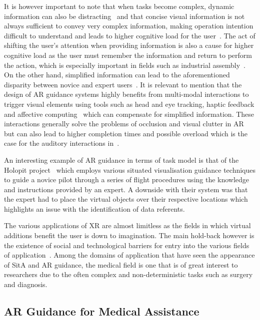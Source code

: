 It is however important to note that when tasks become complex, dynamic information can also be distracting~\cite{wang2022comprehensive} and that concise visual information is not always sufficient to convey very complex information, making operation intention difficult to understand and leads to higher cognitive load for the user~\cite{mizell2001fundamentals,fiorentino2009tangible}.
The act of shifting the user's attention when providing information is also a cause for higher cognitive load as the user must remember the information and return to perform the action, which is especially important in fields such as industrial assembly~\cite{vanneste2020cognitive}.
On the other hand, simplified information can lead to the aforementioned disparity between novice and expert users~\cite{wang2022comprehensive}.
It is relevant to mention that the design of AR guidance systems highly benefits from multi-modal interactions to trigger visual elements using tools such as head and eye tracking, haptic feedback and affective computing~\cite{wang2022comprehensive} which can compensate for simplified information. These interactions generally solve the problems of occlusion and visual clutter in AR~\cite{truong2021user} but can also lead to higher completion times and possible overload which is the case for the auditory interactions in~\cite{marquardt2020comparing}. 

An interesting example of AR guidance in terms of task model is that of the Holopit project~\cite{lallai2021engineering} which employs various situated visualisation guidance techniques to guide a novice pilot through a series of flight procedures using the knowledge and instructions provided by an expert.
A downside with their system was that the expert had to place the virtual objects over their respective locations which highlights an issue with the identification of data referents.

The various applications of XR are almost limitless as the fields in which virtual additions benefit the user is down to imagination. 
The main hold-back however is the existence of social and technological barriers for entry into the various fields of application~\cite{fast2018testing}.
Among the domains of application that have seen the appearance of SitA and AR guidance, the medical field is one that is of great interest to researchers due to the often complex and non-deterministic tasks such as surgery and diagnosis.

\subsection{AR Guidance for Medical Assistance}
\label{medical_ar}

